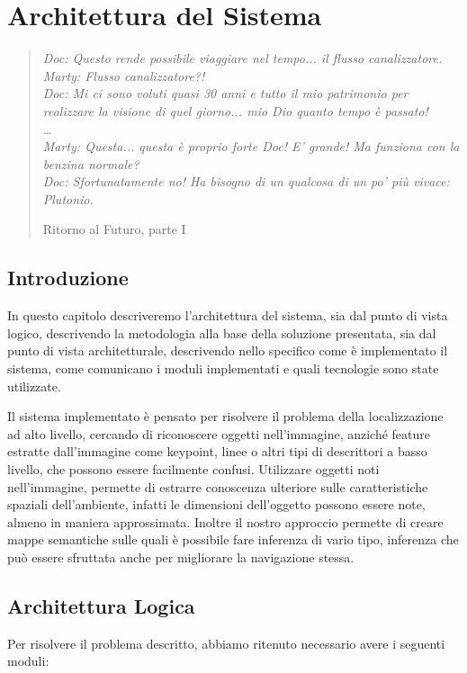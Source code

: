 \chapter{Architettura del Sistema}
\label{cap:architettura}
\thispagestyle{empty}

\begin{quotation}
{\footnotesize
\noindent \emph{Doc: Questo rende possibile viaggiare nel tempo... il flusso canalizzatore.
Marty: Flusso canalizzatore?! \\
Doc: Mi ci sono voluti quasi 30 anni e tutto il mio patrimonio per realizzare la visione di quel giorno... mio Dio quanto tempo è passato! \\
\dots \\
Marty: Questa... questa è proprio forte Doc! E' grande! Ma funziona con la benzina normale? \\
Doc: Sfortunatamente no! Ha bisogno di un qualcosa di un po' più vivace: Plutonio.
}
\begin{flushright}
Ritorno al Futuro, parte I
\end{flushright}
}
\end{quotation}
\vspace{0.5cm}

\section{Introduzione}
In questo capitolo descriveremo l'architettura del sistema, sia dal punto di vista logico, descrivendo la metodologia alla base della soluzione presentata, sia dal punto di vista architetturale, descrivendo nello specifico come è implementato il sistema, come comunicano i moduli implementati e quali tecnologie sono state utilizzate.

Il sistema implementato è pensato per risolvere il problema della localizzazione ad alto livello, cercando di riconoscere oggetti nell'immagine, anziché feature estratte dall'immagine come keypoint, linee o altri tipi di descrittori a basso livello, che possono essere facilmente confusi. Utilizzare oggetti noti nell'immagine, permette di estrarre conoscenza ulteriore sulle caratteristiche spaziali dell'ambiente, infatti le dimensioni dell'oggetto possono essere note, almeno in maniera approssimata. Inoltre il nostro approccio permette di creare mappe semantiche sulle quali è possibile fare inferenza di vario tipo, inferenza che può essere sfruttata anche per migliorare la navigazione stessa.

\section{Architettura Logica}
Per risolvere il problema descritto, abbiamo ritenuto necessario avere i seguenti moduli:


